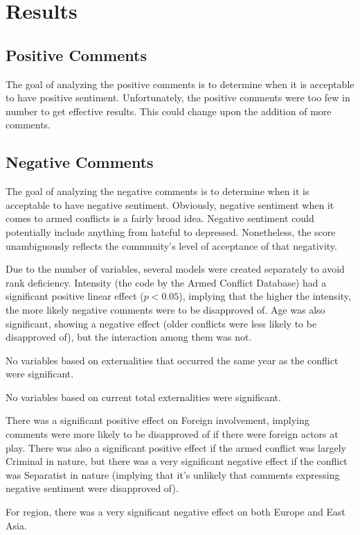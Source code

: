 \section{Results}
\subsection{Positive Comments}
The goal of analyzing the positive comments is to determine when it is acceptable to have positive sentiment. Unfortunately, the positive comments were too few in number to get effective results. This could change upon the addition of more comments.

\subsection{Negative Comments}
The goal of analyzing the negative comments is to determine when it is acceptable to have negative sentiment. Obviously, negative sentiment when it comes to armed conflicts is a fairly broad idea. Negative sentiment could potentially include anything from hateful to depressed. Nonetheless, the score unambiguously reflects the community's level of acceptance of that negativity. 

Due to the number of variables, several models were created separately to avoid rank deficiency. Intensity (the code by the Armed Conflict Database) had a significant positive linear effect ($p < 0.05$), implying that the higher the intensity, the more likely negative comments were to be disapproved of. Age was also significant, showing a negative effect (older conflicts were less likely to be disapproved of), but the interaction among them was not.

No variables based on externalities that occurred the same year as the conflict were significant.

No variables based on current total externalities were significant.

There was a significant positive effect on Foreign involvement, implying comments were more likely to be disapproved of if there were foreign actors at play. There was also a significant positive effect if the armed conflict was largely Criminal in nature, but there was a very significant negative effect if the conflict was Separatist in nature (implying that it's unlikely that comments expressing negative sentiment were disapproved of).

For region, there was a very significant negative effect on both Europe and East Asia.